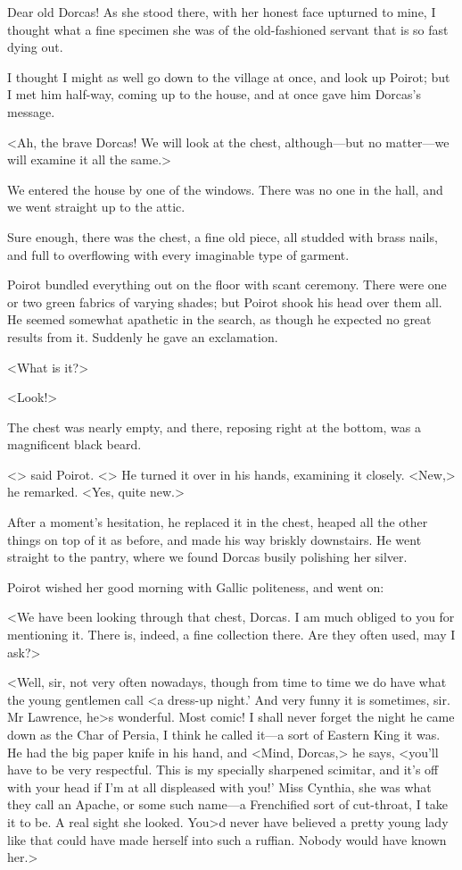  Dear old Dorcas! As she stood there, with her honest face upturned to mine, I thought what a fine specimen she was of the old-fashioned servant that is so fast dying out. 

 I thought I might as well go down to the village at once, and look up Poirot; but I met him half-way, coming up to the house, and at once gave him Dorcas's message. 

 <Ah, the brave Dorcas! We will look at the chest, although—but no matter—we will examine it all the same.> 

 We entered the house by one of the windows. There was no one in the hall, and we went straight up to the attic. 

 Sure enough, there was the chest, a fine old piece, all studded with brass nails, and full to overflowing with every imaginable type of garment. 

 Poirot bundled everything out on the floor with scant ceremony. There were one or two green fabrics of varying shades; but Poirot shook his head over them all. He seemed somewhat apathetic in the search, as though he expected no great results from it. Suddenly he gave an exclamation. 

 <What is it?> 

 <Look!> 

 The chest was nearly empty, and there, reposing right at the bottom, was a magnificent black beard. 

 <> said Poirot. <> He turned it over in his hands, examining it closely. <New,> he remarked. <Yes, quite new.> 

 After a moment's hesitation, he replaced it in the chest, heaped all the other things on top of it as before, and made his way briskly downstairs. He went straight to the pantry, where we found Dorcas busily polishing her silver. 

 Poirot wished her good morning with Gallic politeness, and went on: 

 <We have been looking through that chest, Dorcas. I am much obliged to you for mentioning it. There is, indeed, a fine collection there. Are they often used, may I ask?> 

 <Well, sir, not very often nowadays, though from time to time we do have what the young gentlemen call <a dress-up night.' And very funny it is sometimes, sir. Mr Lawrence, he>s wonderful. Most comic! I shall never forget the night he came down as the Char of Persia, I think he called it—a sort of Eastern King it was. He had the big paper knife in his hand, and <Mind, Dorcas,> he says, <you'll have to be very respectful. This is my specially sharpened scimitar, and it's off with your head if I'm at all displeased with you!' Miss Cynthia, she was what they call an Apache, or some such name—a Frenchified sort of cut-throat, I take it to be. A real sight she looked. You>d never have believed a pretty young lady like that could have made herself into such a ruffian. Nobody would have known her.> 

